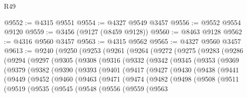 \begin{lexlean}{R49}
\begin{coremodule}
@9552 := @4315 @9551
@9554 := @4327 @9549 @3457
@9556 := @9552 @9554 @9120
@9559 := @3456 (@9127 (@8459 @9128))
@9560 := @8463 @9128
@9562 := @4316 @9560 @3457
@9563 := @4315 @9562
@9565 := @4327 @9560 @3457
@9613 := @9240
    (@9250
      (@9253
        (@9261
          (@9264
            (@9272
              (@9275
                (@9283
                  (@9286
                    (@9294
                      (@9297
                        (@9305
                          (@9308
                            (@9316
                              (@9332
                                (@9342
                                  (@9345
                                    (@9353
                                      (@9369
                                        (@9379
                                          (@9382
                                            (@9390
                                              (@9393
                                                (@9401
                                                  (@9417
                                                    (@9427
                                                      (@9430
                                                        (@9438
                                                          (@9441
                                                            (@9449
                                                              (@9452
                                                                (@9460
                                                                  (@9463
                                                                    (@9471
                                                                      (@9474
                                                                        (@9482
                                                                          (@9498
                                                                            (@9508
                                                                              (@9511
                                                                                (@9519
                                                                                  (@9535
                                                                                    (@9545
                                                                                      (@9548
                                                                                        (@9556
                                                                                          (@9559
                                                                                            (@9563

\end{coremodule}
\end{lexlean}
